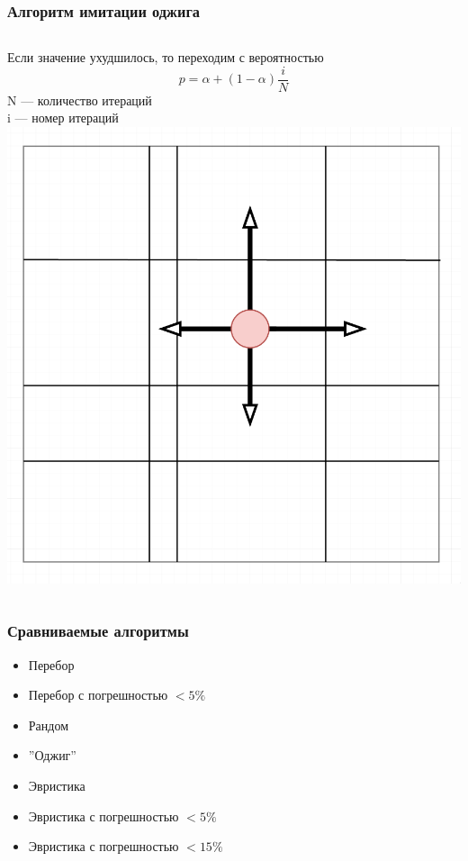 \documentclass{beamer}
\begin{document}
\begin{frame}
\frametitle{Алгоритм имитации оджига}
\begin{columns}
    Если значение ухудшилось, то переходим с вероятностью 
    \[
    p=\alpha + (1 - \alpha) \frac{i}{N}
    \]
    N --- количество итераций\\
    i --- номер итераций
    \includegraphics[width=\textwidth]{gena_move.png}
\end{columns}
\end{frame}

\begin{frame}
    \frametitle{Сравниваемые алгоритмы}
    \begin{itemize}
            \item Перебор
            \item Перебор с погрешностью $<5\%$
            \item Рандом
            \item ''Оджиг''
            \item Эвристика
            \item Эвристика с погрешностью $<5\%$
            \item Эвристика с погрешностью $<15\%$
    \end{itemize}
\end{frame}
\end{document}

